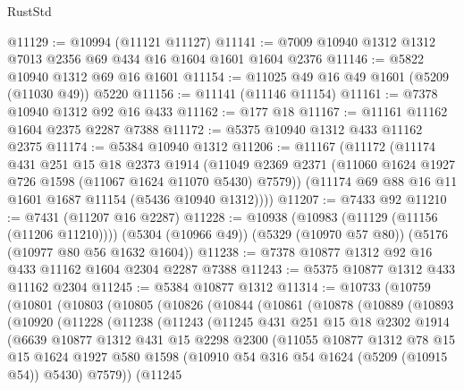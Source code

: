 \begin{lexlean}{RustStd}
\begin{coremodule}
@11129 := @10994 (@11121 @11127)
@11141 := @7009 @10940 @1312 @1312 @7013 @2356 @69 @434 @16 @1604 @1601 @1604 @2376
@11146 := @5822 @10940 @1312 @69 @16 @1601
@11154 := @11025 @49 @16 @49 @1601 (@5209 (@11030 @49)) @5220
@11156 := @11141 (@11146 @11154)
@11161 := @7378 @10940 @1312 @92 @16 @433
@11162 := @177 @18
@11167 := @11161 @11162 @1604 @2375 @2287 @7388
@11172 := @5375 @10940 @1312 @433 @11162 @2375
@11174 := @5384 @10940 @1312
@11206 := @11167
    (@11172
      (@11174
        @431
        @251
        @15
        @18
        @2373
        @1914
        (@11049 @2369 @2371 (@11060 @1624 @1927 @726 @1598 (@11067 @1624 @11070 @5430) @7579))
        (@11174 @69 @88 @16 @11 @1601 @1687 @11154 (@5436 @10940 @1312))))
@11207 := @7433 @92
@11210 := @7431 (@11207 @16 @2287)
@11228 := @10938
    (@10983 (@11129 (@11156 (@11206 @11210))))
    (@5304 (@10966 @49))
    (@5329 (@10970 @57 @80))
    (@5176 (@10977 @80 @56 @1632 @1604))
@11238 := @7378 @10877 @1312 @92 @16 @433 @11162 @1604 @2304 @2287 @7388
@11243 := @5375 @10877 @1312 @433 @11162 @2304
@11245 := @5384 @10877 @1312
@11314 := @10733
    (@10759
      (@10801
        (@10803
          (@10805
            (@10826
              (@10844
                (@10861
                  (@10878
                    (@10889
                      (@10893
                        (@10920
                          (@11228
                            (@11238
                              (@11243
                                (@11245
                                  @431
                                  @251
                                  @15
                                  @18
                                  @2302
                                  @1914
                                  (@6639
                                    @10877
                                    @1312
                                    @431
                                    @15
                                    @2298
                                    @2300
                                    (@11055
                                      @10877
                                      @1312
                                      @78
                                      @15
                                      @15
                                      @1624
                                      @1927
                                      @580
                                      @1598
                                      (@10910 @54 @316 @54 @1624 (@5209 (@10915 @54)) @5430)
                                      @7579))
                                  (@11245

\end{coremodule}
\end{lexlean}

